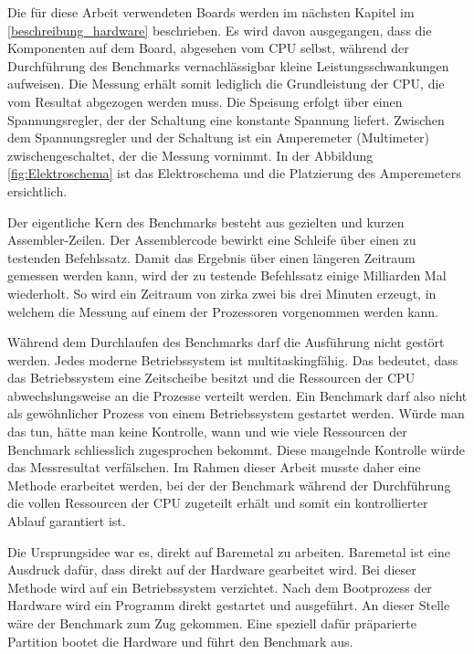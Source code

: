 Die für diese Arbeit verwendeten Boards werden im nächsten Kapitel im \autoref{beschreibung_hardware} beschrieben. Es wird davon ausgegangen, dass die Komponenten auf dem Board, abgesehen vom CPU selbst, während der Durchführung des Benchmarks vernachlässigbar kleine Leistungsschwankungen aufweisen. Die Messung erhält somit lediglich die Grundleistung der CPU, die vom Resultat abgezogen werden muss. Die Speisung erfolgt über einen Spannungsregler, der der Schaltung eine konstante Spannung liefert. Zwischen dem Spannungsregler und der Schaltung ist ein Amperemeter (Multimeter) zwischengeschaltet, der die Messung vornimmt. In der Abbildung \ref{fig:Elektroschema} ist das Elektroschema und die Platzierung des Amperemeters ersichtlich.
\par
Der eigentliche Kern des Benchmarks besteht aus gezielten und kurzen Assembler-Zeilen. Der Assemblercode bewirkt eine Schleife über einen zu testenden Befehlssatz. Damit das Ergebnis über einen längeren Zeitraum gemessen werden kann, wird der zu testende Befehlssatz einige Milliarden Mal wiederholt. So wird ein Zeitraum von zirka zwei bis drei Minuten erzeugt, in welchem die Messung auf einem der Prozessoren vorgenommen werden kann.
\par
Während dem Durchlaufen des Benchmarks darf die Ausführung nicht gestört werden. Jedes moderne Betriebssystem ist multitaskingfähig. Das bedeutet, dass das Betriebssystem eine Zeitscheibe besitzt und die Ressourcen der CPU abwechslungsweise an die Prozesse verteilt werden. Ein Benchmark darf also nicht als gewöhnlicher Prozess von einem Betriebssystem gestartet werden. Würde man das tun, hätte man keine Kontrolle, wann und wie viele Ressourcen der Benchmark schliesslich zugesprochen bekommt. Diese mangelnde Kontrolle würde das Messresultat verfälschen. Im Rahmen dieser Arbeit musste daher eine Methode erarbeitet werden, bei der der Benchmark während der Durchführung die vollen Ressourcen der CPU zugeteilt erhält und somit ein kontrollierter Ablauf garantiert ist.
\par
Die Ursprungsidee war es, direkt auf Baremetal zu arbeiten. Baremetal ist eine Ausdruck dafür, dass direkt auf der Hardware gearbeitet wird. Bei dieser Methode wird auf ein Betriebssystem verzichtet. Nach dem Bootprozess der Hardware wird ein Programm direkt gestartet und ausgeführt. An dieser Stelle wäre der Benchmark zum Zug gekommen. Eine speziell dafür präparierte Partition bootet die Hardware und führt den Benchmark aus.
\par
